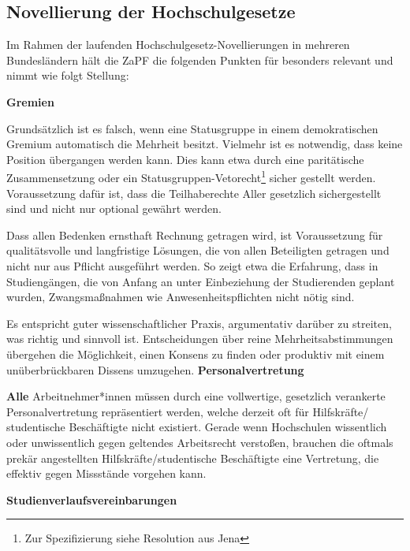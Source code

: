 
\subsection{Novellierung der Hochschulgesetze}

Im Rahmen der laufenden Hochschulgesetz-Novellierungen in mehreren Bundesländern hält die ZaPF die folgenden Punkten für besonders relevant und nimmt wie folgt Stellung:

\textbf{Gremien}

Grundsätzlich ist es falsch, wenn eine Statusgruppe in einem demokratischen Gremium automatisch die Mehrheit besitzt. Vielmehr ist es notwendig, dass keine Position übergangen werden kann. Dies kann etwa durch eine paritätische Zusammensetzung oder ein Statusgruppen-Vetorecht\footnote{Zur Spezifizierung siehe Resolution aus Jena} %
sicher gestellt werden. Voraussetzung dafür ist, dass die Teilhaberechte Aller gesetzlich sichergestellt sind und nicht nur optional gewährt werden.

Dass allen Bedenken ernsthaft Rechnung getragen wird, ist Voraussetzung für qualitätsvolle und langfristige Lösungen, die von allen Beteiligten getragen und nicht nur aus Pflicht ausgeführt werden. So zeigt etwa die Erfahrung, dass in Studiengängen, die von Anfang an unter Einbeziehung der Studierenden geplant wurden, Zwangsmaßnahmen wie Anwesenheitspflichten nicht nötig sind.

Es entspricht guter wissenschaftlicher Praxis, argumentativ darüber zu streiten, was richtig und sinnvoll ist. Entscheidungen über reine Mehrheitsabstimmungen übergehen die Möglichkeit, einen Konsens zu finden oder produktiv mit einem unüberbrückbaren Dissens umzugehen.
\newpage
\textbf{Personalvertretung}

\textbf{Alle} Arbeitnehmer*innen müssen durch eine vollwertige, gesetzlich verankerte Personalvertretung repräsentiert werden, welche derzeit oft für Hilfskräfte/ studentische Beschäftigte nicht existiert. Gerade wenn Hochschulen wissentlich oder unwissentlich gegen geltendes Arbeitsrecht verstoßen, brauchen die oftmals prekär angestellten Hilfskräfte/studentische Beschäftigte eine Vertretung, die effektiv gegen Missstände vorgehen kann.

\textbf{Studienverlaufsvereinbarungen}

